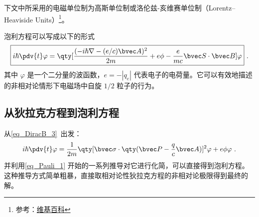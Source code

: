 

下文中所采用的电磁单位制为高斯单位制或洛伦兹-亥维赛单位制（Lorentz–Heaviside Units）\footnote{参考：\href{https://en.wikipedia.org/wiki/Heaviside\%E2\%80\%93Lorentz_units}{维基百科}}。

泡利方程可以写成以下的形式
\begin{equation}
\boxed{
i\hbar\pdv{t} \varphi = \qty[\frac{(-i\hbar\nabla - (e/c)\bvec A)^2}{2m}+e\phi-\frac{e}{mc}\bvec S\cdot \bvec B]\varphi}~.
\end{equation}
其中 $\varphi$ 是一个二分量的波函数，$e=-|q_e|$ 代表电子的电荷量。它可以有效地描述的非相对论情形下电磁场中自旋 $1/2$ 粒子的行为。
\subsection{从狄拉克方程到泡利方程}
从\autoref{eq_DiracB_3}~出发：
\begin{equation}
i\hbar\pdv{t} \varphi = \frac{1}{2m}\qty[\bvec \sigma \cdot\qty(\bvec P - \frac{q}{c}\bvec A)]^2 \varphi + e\phi  \varphi~.
\end{equation}
并利用\autoref{eq_Pauli_1} 开始的一系列推导对它进行化简，可以直接得到泡利方程。这种推导方式简单粗暴，直接取相对论性狄拉克方程的非相对论极限得到最终的解。
